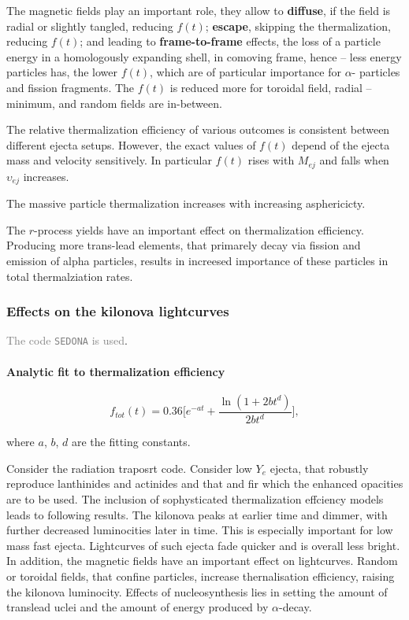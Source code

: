 \documentclass[11pt,a4paper,headinclude=true,DIV=14,BCOR=8mm,chapterprefix,listof=totoc,twoside,openright,abstracton]{scrbook}
\newcommand{\gray}[1]{\textcolor{gray}{#1}}
\begin{document}
The magnetic fields play an important role, they allow to \textbf{diffuse}, if the field is radial or slightly tangled, reducing $f(t)$; \textbf{escape}, skipping the thermalization, reducing $f(t)$; and leading to \textbf{frame-to-frame} effects, the loss of a particle energy in a homologously expanding shell, in comoving frame, hence -- less energy particles has, the lower $f(t)$, which are of particular importance for $\alpha$- particles and fission fragments.
The $f(t)$ is reduced more for toroidal field, radial -- minimum, and random fields are in-between.

The relative thermalization efficiency of various outcomes is consistent between different ejecta setups. However, the exact values of $f(t)$ depend of the ejecta mass and velocity sensitively. In particular $f(t)$ rises with $M_{ej}$ and falls when $\upsilon_{ej}$ increases. 

The massive particle thermalization increases with increasing asphericicty. 

The $r$-process yields have an important effect on thermalization efficiency. Producing more trans-lead elements, that primarely decay via fission and emission of alpha particles, results in increesed importance of these particles in total thermalziation rates.

\subsubsection{Effects on the kilonova lightcurves}

\gray{The code \texttt{SEDONA} is used}.

\paragraph{Analytic fit to thermalization efficiency}

\begin{equation}
    f_{tot}(t) = 0.36 \Bigg[e^{-at} + \frac{\ln(1+2bt^d)}{2bt^d}\Bigg],
\end{equation}

where $a$, $b$, $d$ are the fitting constants. 
 
Consider the radiation traposrt code. Consider low $Y_e$ ejecta, that robustly reproduce lanthinides and actinides and that and fir which the enhanced opacities are to be used. The inclusion of sophysticated thermalization effciency models leads to following results.
The kilonova peaks at earlier time and dimmer, with further decreased luminocities later in time. This is especially important for low mass fast ejecta. Lightcurves of such ejecta fade quicker and is overall less bright. 
In addition, the magnetic fields have an important effect on lightcurves. Random or toroidal fields, that confine particles, increase thernalisation efficiency, raising the kilonova luminocity. 
Effects of nucleosynthesis lies in setting the amount of translead uclei and the amount of energy produced by $\alpha$-decay. 
\end{document}
